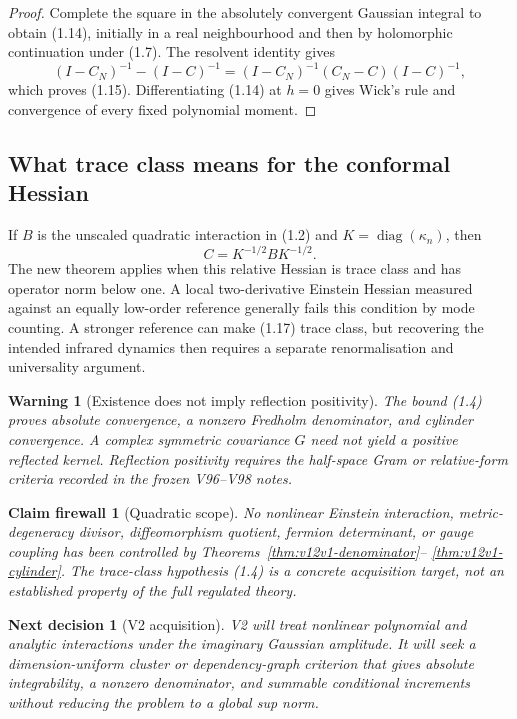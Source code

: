 \documentclass[11pt]{article}
\newtheorem{warning}[theorem]{Warning}
\newtheorem{firewall}[theorem]{Claim firewall}
\newtheorem{decision}[theorem]{Next decision}
\theoremstyle{remark}
\begin{document}
\begin{proof}
Complete the square in the absolutely convergent Gaussian integral to
obtain (1.14), initially in a real neighbourhood and then by
holomorphic continuation under (1.7).  The resolvent identity gives
\[
 (I-C_N)^{-1}-(I-C)^{-1}
 =(I-C_N)^{-1}(C_N-C)(I-C)^{-1},
\]
which proves (1.15).  Differentiating (1.14) at \(h=0\) gives Wick's
rule and convergence of every fixed polynomial moment.
\end{proof}

\subsection{What trace class means for the conformal Hessian}

If \(B\) is the unscaled quadratic interaction in (1.2) and
\(K=\operatorname{diag}(\kappa_n)\), then
\[
                              C=K^{-1/2}BK^{-1/2}.            \tag{1.17}
\]
The new theorem applies when this relative Hessian is trace class and
has operator norm below one.  A local two-derivative Einstein Hessian
measured against an equally low-order reference generally fails this
condition by mode counting.  A stronger reference can make (1.17)
trace class, but recovering the intended infrared dynamics then
requires a separate renormalisation and universality argument.

\begin{warning}[Existence does not imply reflection positivity]
\label{warn:v12v1-reflection}
The bound (1.4) proves absolute convergence, a nonzero Fredholm
denominator, and cylinder convergence.  A complex symmetric
covariance \(G\) need not yield a positive reflected kernel.
Reflection positivity requires the half-space Gram or relative-form
criteria recorded in the frozen V96--V98 notes.
\end{warning}

\begin{firewall}[Quadratic scope]
\label{fire:v12v1-boundary}
No nonlinear Einstein interaction, metric-degeneracy divisor,
diffeomorphism quotient, fermion determinant, or gauge coupling has
been controlled by Theorems~\ref{thm:v12v1-denominator}--
\ref{thm:v12v1-cylinder}.  The trace-class hypothesis (1.4) is a
concrete acquisition target, not an established property of the full
regulated theory.
\end{firewall}

\begin{decision}[V2 acquisition]
\label{dec:v12v1-next}
V2 will treat nonlinear polynomial and analytic interactions under
the imaginary Gaussian amplitude.  It will seek a dimension-uniform
cluster or dependency-graph criterion that gives absolute
integrability, a nonzero denominator, and summable conditional
increments without reducing the problem to a global sup norm.
\end{decision}
\end{document}
